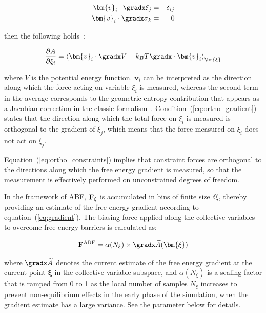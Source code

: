 \begin{eqnarray}
\label{eq:ortho_gradient}
\bm{v}_{i} \cdot \gradx \xi_{j}    & = & \delta_{ij}\\
\label{eq:ortho_constraints}
\bm{v}_{i} \cdot \gradx \sigma_{k} & = & 0
\end{eqnarray}

then the following holds~\cite{Ciccotti2005}:

\begin{equation}
\label{eq:gradient_vector}
\frac{\partial A}{\partial \xi_{i}} = \left\langle \bm{v}_{i} \cdot \gradx V
- k_B T \gradx \cdot \bm{v}_{i} \right\rangle_{\bm{\xi}}
\end{equation}

where $V$ is the potential energy function.
$\bm{v}_{i}$ can be interpreted as the direction along which the force
acting on variable $\xi_{i}$ is measured, whereas the second term in the
average corresponds to the geometric entropy contribution that appears
as a Jacobian correction in the classic formalism~\cite{Carter1989}.
Condition~(\ref{eq:ortho_gradient}) states that the direction along
which the total force on $\xi_{i}$ is measured is orthogonal to the
gradient of $\xi_{j}$, which means that the force measured on $\xi_{i}$
does not act on $\xi_{j}$.

Equation~(\ref{eq:ortho_constraints}) implies that constraint forces
are orthogonal to the directions along which the free energy gradient is
measured, so that the measurement is effectively performed on unconstrained
degrees of freedom.

In the framework of ABF,
${\bf F}_\xi$ is accumulated in bins of finite size $\delta \xi$,
thereby providing an estimate of the free energy gradient
according to equation~({\ref{eq:gradient}}).
The biasing force applied along the collective variables
to overcome free energy barriers is calculated as:

\begin{equation}
  \label{eq:abf}
  {\bf F}^{\rm ABF} = \alpha(N_\xi) \times \gradx \widetilde A(\bm{\xi})
\end{equation}

where $\gradx \widetilde A$ denotes the current estimate of the
free energy gradient at the current point $\bm{\xi}$ in the collective
variable subspace, and $\alpha(N_\xi)$ is a scaling factor that is ramped
from 0 to 1 as the local number of samples $N_\xi$ increases
to prevent non-equilibrium effects in the early phase of the simulation,
when the gradient estimate has a large variance.
See the  parameter below for details.

